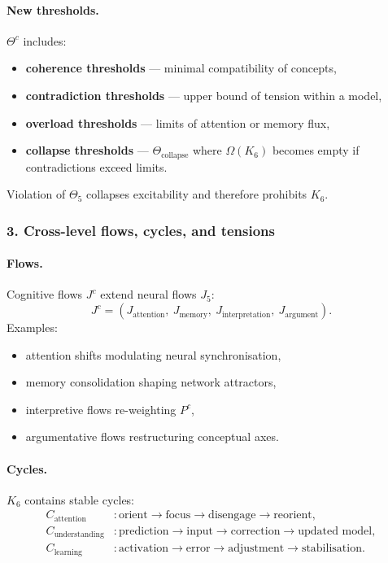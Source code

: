 \paragraph{New thresholds.}
$\Theta^{c}$ includes:
\begin{itemize}
  \item \textbf{coherence thresholds} — minimal compatibility of concepts,
  \item \textbf{contradiction thresholds} — upper bound of tension within a model,
  \item \textbf{overload thresholds} — limits of attention or memory flux,
  \item \textbf{collapse thresholds} — $\Theta_{\mathrm{collapse}}$ where
        $\Omega(K_6)$ becomes empty if contradictions exceed limits.
\end{itemize}

Violation of $\Theta_5$ collapses excitability and therefore prohibits $K_6$.

\subsubsection{3. Cross-level flows, cycles, and tensions}

\paragraph{Flows.}
Cognitive flows $J^{c}$ extend neural flows $J_5$:
\[
J^{c} = (J_{\mathrm{attention}},\ J_{\mathrm{memory}},\ 
        J_{\mathrm{interpretation}},\ J_{\mathrm{argument}}).
\]
Examples:
\begin{itemize}
  \item attention shifts modulating neural synchronisation,
  \item memory consolidation shaping network attractors,
  \item interpretive flows re-weighting $P^{c}$,
  \item argumentative flows restructuring conceptual axes.
\end{itemize}

\paragraph{Cycles.}
$K_6$ contains stable cycles:
\begin{align*}
C_{\mathrm{attention}} &: \text{orient} \rightarrow \text{focus} 
    \rightarrow \text{disengage} \rightarrow \text{reorient},\\[4pt]
C_{\mathrm{understanding}} &: \text{prediction} \rightarrow \text{input}
    \rightarrow \text{correction} \rightarrow \text{updated model},\\[4pt]
C_{\mathrm{learning}} &: \text{activation} \rightarrow \text{error}
    \rightarrow \text{adjustment} \rightarrow \text{stabilisation}.
\end{align*}

